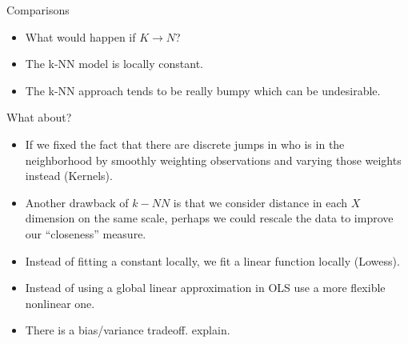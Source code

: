 \begin{frame}{Comparisons}
\begin{itemize}
\item What would happen if $K \rightarrow N$?
\item The k-NN model is locally constant.
\item The k-NN approach tends to be really bumpy which can be undesirable.
\end{itemize}
\end{frame}
\begin{frame}{What about?}
\begin{itemize}
\item If we fixed the fact that there are discrete jumps in who is in the neighborhood by smoothly weighting observations and varying those weights instead (Kernels).
\item Another drawback of $k-NN$ is that we consider distance in each $X$ dimension on the same scale, perhaps we could rescale the data to improve our ``closeness'' measure.
\item Instead of fitting a constant locally, we fit a linear function locally (Lowess).
\item Instead of using a global linear approximation in OLS use a more flexible nonlinear one.
\item There is a bias/variance tradeoff. \alert{explain}.
\end{itemize}
\end{frame}


